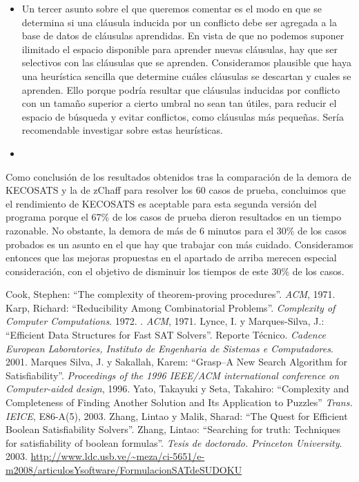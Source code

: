 \documentclass[12pt,lettersize,oneside]{article}
\begin{document}
\begin{itemize}
\item Un tercer asunto sobre el que queremos comentar es el modo en que se
  determina si una cláusula inducida por un conflicto debe ser agregada a la
  base de datos de cláusulas aprendidas. En vista de que no podemos suponer
  ilimitado el espacio disponible para aprender nuevas cláusulas, hay que ser
  selectivos con las cláusulas que se aprenden. Consideramos plausible que haya
  una heurística sencilla que determine cuáles cláusulas se descartan y cuales
  se aprenden. Ello porque podría resultar que cláusulas inducidas por conflicto
  con un tamaño superior a cierto umbral no sean tan útiles, para reducir el
  espacio de búsqueda y evitar conflictos, como cláusulas más pequeñas. Sería
  recomendable investigar sobre estas heurísticas.

\item 

\end{itemize}

Como conclusión de los resultados obtenidos tras la comparación de la demora de
KECOSATS y la de zChaff para resolver los 60 casos de prueba, concluimos que el
rendimiento de KECOSATS es aceptable para esta segunda versión del programa
porque el 67\% de los casos de prueba dieron resultados en un tiempo
razonable. No obstante, la demora de más de 6 minutos para el 30\% de los casos
probados es un asunto en el que hay que trabajar con más cuidado. Consideramos
entonces que las mejoras propuestas en el apartado de arriba merecen especial
consideración, con el objetivo de disminuir los tiempos de este 30\% de los
casos.

\begin{thebibliography}{99}
Cook, Stephen: ``The complexity of theorem-proving
  procedures''. \emph{ACM}, 1971.
Karp, Richard: ``Reducibility Among Combinatorial
  Problems''. \emph{Complexity of Computer Computations}. 1972.
  . \emph{ACM}, 1971.
Lynce, I. y Marques-Silva, J.: ``Efficient Data Structures for
  Fast SAT Solvers''. Reporte Técnico. \emph{Cadence European Laboratories,
    Instituto de Engenharia de Sistemas e Computadores}. 2001.
Marques Silva, J. y Sakallah, Karem: ``Grasp--A New Search
  Algorithm for Satisfiability''. \emph{Proceedings of the 1996 IEEE/ACM
    international conference on Computer-aided design}, 1996.
Yato, Takayuki y Seta, Takahiro: ``Complexity and Completeness
  of Finding Another Solution and Its Application to Puzzles''  \emph{Trans. IEICE}, E86-A(5), 2003.
Zhang, Lintao y Malik, Sharad: ``The Quest for Efficient Boolean
  Satisfiability Solvers''.
Zhang, Lintao: ``Searching for truth: Techniques for
  satisfiability of boolean formulas''. \emph{Tesis de doctorado. Princeton
    University}. 2003.
\url{http://www.ldc.usb.ve/~meza/ci-5651/e-m2008/articulosYsoftware/FormulacionSATdeSUDOKU}
\end{thebibliography}
\end{document}
